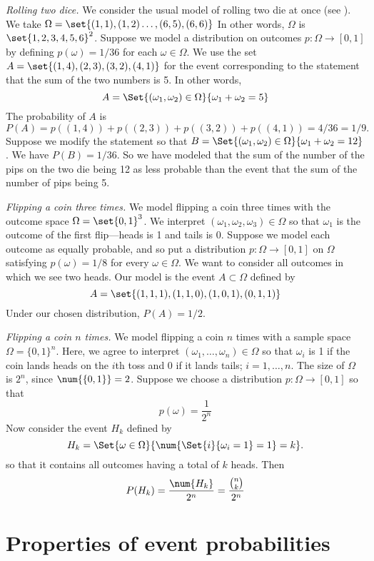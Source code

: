 \textit{Rolling two dice.}
We consider the usual model of rolling two die at once (see ).
We take $\Omega  = \set{(1,1), (1,2) \dots , (6,5), (6,6)}$
In other words, $\Omega $ is $\set{1,2,3,4,5,6}^2$.
Suppose we model a distribution on outcomes $p: \Omega  \to [0,1]$ by defining $p(\omega ) = 1/36$ for each $\omega  \in \Omega $.
We use the set $A = \set{(1,4), (2,3), (3, 2), (4,1)}$ for the event corresponding to the statement that the sum of the two numbers is 5.
In other words,
\[
A = \Set{(\omega _1, \omega _2) \in \Omega }{ \omega _1 + \omega _2 = 5}
\]
The probability of $A$ is
\[
P(A) = p((1,4)) + p((2,3)) + p((3,2)) + p((4,1)) = 4/36 = 1/9.
\]
Suppose we modify the statement so that $B = \Set{(\omega _1,\omega _2) \in \Omega }{\omega _1 + \omega _2 = 12}$.
We have $P(B) = 1/36$.
So we have modeled that the sum of the number of the pips on the two die being 12 as less probable than the event that the sum of the number of pips being 5.

\textit{Flipping a coin three times.}
We model flipping a coin three times with the outcome space $\Omega  = \set{0,1}^3$.
We interpret $(\omega _1, \omega _2, \omega _3) \in \Omega $ so that $\omega _1$ is the outcome of the first flip---heads is 1 and tails is 0.
Suppose we model each outcome as equally probable, and so put a distribution $p: \Omega  \to [0,1]$ on $\Omega $ satisfying $p(\omega ) = 1/8$ for every $\omega  \in \Omega $.
We want to consider all outcomes in which we see two heads.
Our model is the event $A \subset \Omega $ defined by
\[
A = \set{(1,1,1), (1,1,0), (1,0,1), (0,1,1)}
\]
Under our chosen distribution, $P(A) = 1/2$.

\textit{Flipping a coin $n$ times.}
We model flipping a coin $n$ times with a sample space $\Omega  = \{0,1\}^n$.
Here, we agree to interpret $(\omega _1, \dots , \omega _n) \in \Omega $ so that $\omega _i$ is 1 if the coin lands heads on the $i$th toss and $0$ if it lands tails; $i = 1, \dots , n$.
The size of $\Omega $ is $2^n$, since $\num{\{0,1\}} = 2$.
Suppose we choose a distribution $p: \Omega  \to [0,1]$ so that
\[
p(\omega ) = \frac{1}{2^n}
\]
Now consider the event $H_k$ defined by
\[
H_k = \Set{\omega  \in \Omega }{\num{\Set{i}{\omega _i = 1} = 1} = k}.
\]
so that it contains all outcomes having a total of $k$ heads.
Then
\[
P(H_k) = \frac{\num{H_k}}{2^n} = \frac{{n \choose k}}{2^n}
\]

\section*{Properties of event probabilities}

